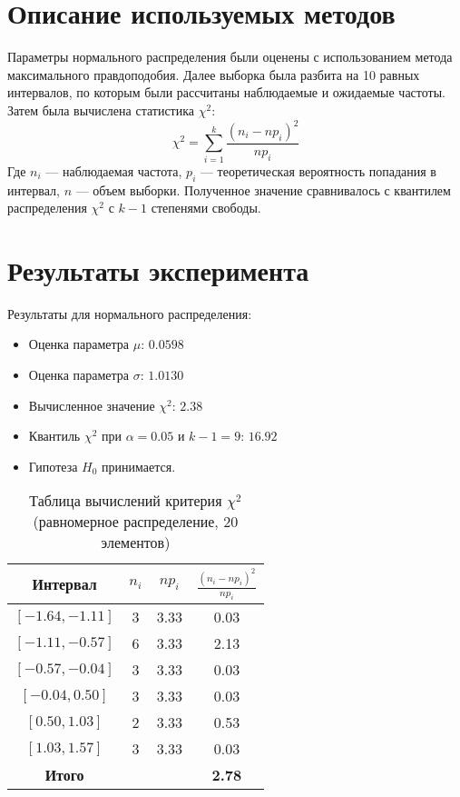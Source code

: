 \documentclass[a4paper]{article}
\begin{document}
    \section{Описание используемых методов}
    Параметры нормального распределения были оценены с использованием метода максимального правдоподобия.
    Далее выборка была разбита на 10 равных интервалов, по которым были рассчитаны наблюдаемые и ожидаемые частоты.
    Затем была вычислена статистика $\chi^2$:
    \[
        \chi^2 = \sum_{i=1}^{k} \frac{(n_i - np_i)^2}{np_i}
    \]
    Где $n_i$ — наблюдаемая частота, $p_i$ — теоретическая вероятность попадания в интервал, $n$ — объем выборки.
    Полученное значение сравнивалось с квантилем распределения $\chi^2$ с $k-1$ степенями свободы.


    \section{Результаты эксперимента}
    Результаты для нормального распределения:
    \begin{itemize}
        \item Оценка параметра $\mu$: $0.0598$
        \item Оценка параметра $\sigma$: $1.0130$
        \item Вычисленное значение $\chi^2$: $2.38$
        \item Квантиль $\chi^2$ при $\alpha = 0.05$ и $k-1=9$: $16.92$
        \item Гипотеза $H_0$ принимается.
    \end{itemize}

    \begin{table}[H]
        \centering
        \caption{Таблица вычислений критерия $\chi^2$ (равномерное распределение, 20 элементов)}
        \begin{tabular}{|c|c|c|c|}
            \hline
            Интервал         & $n_i$ & $np_i$ & $\frac{(n_i - np_i)^2}{np_i}$ \\
            \hline
            $[-1.64, -1.11]$ & 3     & 3.33   & 0.03                          \\
            $[-1.11, -0.57]$ & 6     & 3.33   & 2.13                          \\
            $[-0.57, -0.04]$ & 3     & 3.33   & 0.03                          \\
            $[-0.04, 0.50]$  & 3     & 3.33   & 0.03                          \\
            $[0.50, 1.03]$   & 2     & 3.33   & 0.53                          \\
            $[1.03, 1.57]$   & 3     & 3.33   & 0.03                          \\
            \hline
            \textbf{Итого}   &       &        & \textbf{2.78}                 \\
            \hline
        \end{tabular}
    \end{table}
\end{document}
